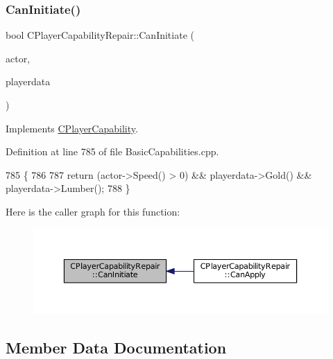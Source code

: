 \subsubsection{\texorpdfstring{Can\+Initiate()}{CanInitiate()}}
{\footnotesize\ttfamily bool C\+Player\+Capability\+Repair\+::\+Can\+Initiate (\begin{DoxyParamCaption}\item[{std\+::shared\+\_\+ptr$<$ \hyperlink{classCPlayerAsset}{C\+Player\+Asset} $>$}]{actor,  }\item[{std\+::shared\+\_\+ptr$<$ \hyperlink{classCPlayerData}{C\+Player\+Data} $>$}]{playerdata }\end{DoxyParamCaption})\hspace{0.3cm}{\ttfamily [virtual]}}



Implements \hyperlink{classCPlayerCapability_aa83b1e1fcaff2985c378132d679154ea}{C\+Player\+Capability}.



Definition at line 785 of file Basic\+Capabilities.\+cpp.


\begin{DoxyCode}
785                                                                                                            
                \{
786     
787     \textcolor{keywordflow}{return} (actor->Speed() > 0) && playerdata->Gold() && playerdata->Lumber();
788 \}
\end{DoxyCode}
Here is the caller graph for this function\+:
\nopagebreak
\begin{figure}[H]
\begin{center}
\leavevmode
\includegraphics[width=350pt]{classCPlayerCapabilityRepair_a579761cab74d447b95856a24a7841b2e_icgraph}
\end{center}
\end{figure}


\subsection{Member Data Documentation}
\hypertarget{classCPlayerCapabilityRepair_ac0cc247c8d2ba96b6c6feabfcfb6ac19}{}\label{classCPlayerCapabilityRepair_ac0cc247c8d2ba96b6c6feabfcfb6ac19} 
